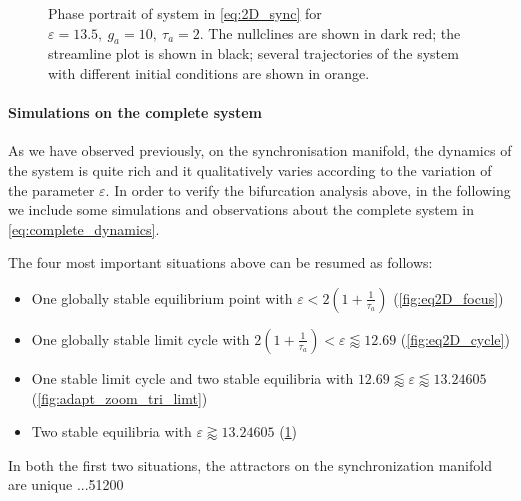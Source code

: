 \begin{figure}[!h]
        \caption{\label{fig:eq2D_cycle_after_collapse} Phase portrait of system in \eqref{eq:2D_sync} for $\varepsilon=13.5,\ g_a=10,\ \tau_a=2$. The nullclines are shown in dark red; the streamline plot is shown in black; several trajectories of the system with different initial conditions are shown in orange. }
\end{figure}

\paragraph{Simulations on the complete system}
As we have observed previously, on the synchronisation manifold, the dynamics of the system is quite rich and it qualitatively varies according to the variation of the parameter $\varepsilon$. In order to verify the bifurcation analysis above, in the following we include some simulations and observations about the complete system in \cref{eq:complete_dynamics}. 

The four most important situations above can be resumed as follows:
\begin{itemize}
    \item One globally stable equilibrium point with $\varepsilon<2(1+\frac{1}{\tau_a})$ (\cref{fig:eq2D_focus})
    \item One globally stable limit cycle with $2(1+\frac{1}{\tau_a}) < \varepsilon \lessapprox 12.69$ (\cref{fig:eq2D_cycle})
    \item One stable limit cycle and two stable equilibria with $12.69 \lessapprox \varepsilon \lessapprox 13.24605$ (\cref{fig:adapt_zoom_tri_limt})
    \item Two stable equilibria with $\varepsilon \gtrapprox 13.24605$ (\cref{fig:eq2D_cycle_after_collapse})
\end{itemize}
In both the first two situations, the attractors on the synchronization manifold are unique ...51200

